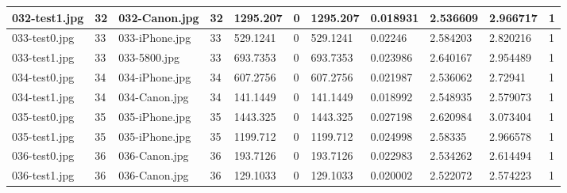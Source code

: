\begin{landscape}
\begin{longtable}{|p{2cm}|p{1cm}|p{2cm}|p{1cm}|p{2cm}|p{1cm}|p{2cm}|p{2cm}|p{2cm}|p{2cm}|p{1cm}|}
		032-test1.jpg   & 32               & 032-Canon.jpg         & 32                          & 1295.207              & 0                       & 1295.207                   & 0.018931              & 2.536609              & 2.966717                 & 1                \\ \hline
		033-test0.jpg   & 33               & 033-iPhone.jpg        & 33                          & 529.1241              & 0                       & 529.1241                   & 0.02246               & 2.584203              & 2.820216                 & 1                \\ \hline
		033-test1.jpg   & 33               & 033-5800.jpg          & 33                          & 693.7353              & 0                       & 693.7353                   & 0.023986              & 2.640167              & 2.954489                 & 1                \\ \hline
		034-test0.jpg   & 34               & 034-iPhone.jpg        & 34                          & 607.2756              & 0                       & 607.2756                   & 0.021987              & 2.536062              & 2.72941                  & 1                \\ \hline
		034-test1.jpg   & 34               & 034-Canon.jpg         & 34                          & 141.1449              & 0                       & 141.1449                   & 0.018992              & 2.548935              & 2.579073                 & 1                \\ \hline
		035-test0.jpg   & 35               & 035-iPhone.jpg        & 35                          & 1443.325              & 0                       & 1443.325                   & 0.027198              & 2.620984              & 3.073404                 & 1                \\ \hline
		035-test1.jpg   & 35               & 035-iPhone.jpg        & 35                          & 1199.712              & 0                       & 1199.712                   & 0.024998              & 2.58335               & 2.966578                 & 1                \\ \hline
		036-test0.jpg   & 36               & 036-Canon.jpg         & 36                          & 193.7126              & 0                       & 193.7126                   & 0.022983              & 2.534262              & 2.614494                 & 1                \\ \hline
		036-test1.jpg   & 36               & 036-Canon.jpg         & 36                          & 129.1033              & 0                       & 129.1033                   & 0.020002              & 2.522072              & 2.574223                 & 1                \\ \hline

\end{longtable}
\end{landscape}
